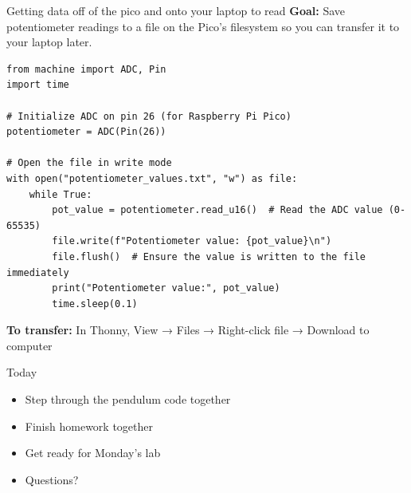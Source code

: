 \documentclass{beamer}
\begin{document}
\begin{frame}[fragile]{Getting data off of the pico and onto your laptop to read}
  \textbf{Goal:} Save potentiometer readings to a file on the Pico's filesystem so you can transfer it to your laptop later.
  \vspace{1em}

    \begin{verbatim}
from machine import ADC, Pin
import time

# Initialize ADC on pin 26 (for Raspberry Pi Pico)
potentiometer = ADC(Pin(26))

# Open the file in write mode
with open("potentiometer_values.txt", "w") as file:
    while True:
        pot_value = potentiometer.read_u16()  # Read the ADC value (0-65535)
        file.write(f"Potentiometer value: {pot_value}\n")
        file.flush()  # Ensure the value is written to the file immediately
        print("Potentiometer value:", pot_value)
        time.sleep(0.1)
\end{verbatim}
  
  \vspace{0.5em}
  \small
  \textbf{To transfer:} In Thonny, View → Files → Right-click file → Download to computer
\end{frame}

\begin{frame}{Today}
  \begin{itemize}
  \item Step through the pendulum code together
  \item Finish homework together
  \item Get ready for Monday's lab
  \item Questions?
  \end{itemize}
\end{frame}
\end{document}
